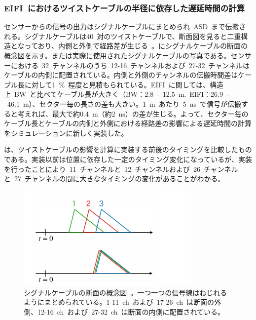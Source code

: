 \subsubsection{EIFI~におけるツイストケーブルの半径に依存した遅延時間の計算}
センサーからの信号の出力はシグナルケーブルにまとめられ~ASD~まで伝搬される。シグナルケーブルは40~対のツイストケーブルで、断面図を見ると二重構造となっており、内側と外側で経路差が生じる~\cite{MT:04}。にシグナルケーブルの断面の概念図を示す。または実際に使用されたシグナルケーブルの写真である。センサーにおける~32~チャンネルのうち~12-16~チャンネルおよび~27-32~チャンネルはケーブルの内側に配置されている。内側と外側のチャンネルの伝搬時間差はケーブル長に対して1~$\%$~程度と見積もられている。EIFI~に関しては、構造上~BW~と比べてケーブル長が大きく（BW：2.8~-~12.5~m,~EIFI：26.9~-~46.1~m）、セクター毎の長さの差も大きい。1~m~あたり~5~ns~で信号が伝搬すると考えれば、最大で約0.4~m（約2~ns）の差が生じる。よって、セクター毎のケーブル長とケーブルの内側と外側における経路差の影響による遅延時間の計算をシミュレーションに新しく実装した。

は、ツイストケーブルの影響を計算に実装する前後のタイミングを比較したものである。実装以前は位置に依存した一定のタイミング変化になっているが、実装を行ったことにより~11~チャンネルと~12~チャンネルおよび~26~チャンネルと~27~チャンネルの間に大きなタイミングの変化があることがわかる。

\begin{figure}[H]
    \centering   
    \includegraphics[width=0.8\textwidth,page=6]{img/slide/slide.pdf}
    \caption[シグナルケーブルの断面の概念図]{シグナルケーブルの断面の概念図~\cite{MT:04}。一つ一つの信号線はねじれるようにまとめられている。1-11~ch~および~17-26~ch~は断面の外側、12-16~ch~および~27-32~ch~は断面の内側に配置されている。}
    \label{fig:twist0}
\end{figure}

